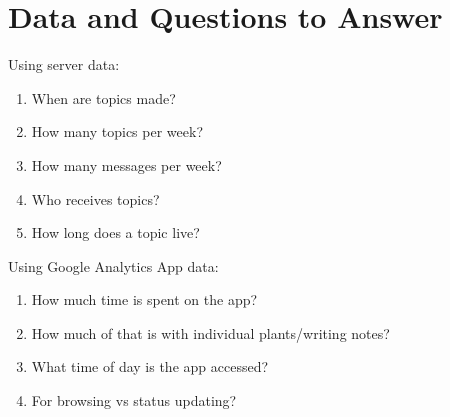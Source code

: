 \section{Data and Questions to Answer}

  Using server data:
  \begin{enumerate}
    \item When are topics made?
    \item How many topics per week?
    \item How many messages per week?
    \item Who receives topics?
    \item How long does a topic live?
  \end{enumerate}

  Using Google Analytics App data:
  \begin{enumerate}
    \item How much time is spent on the app?
    \item How much of that is with individual plants/writing notes?
    \item What time of day is the app accessed?
    \item For browsing vs status updating?
  \end{enumerate}

